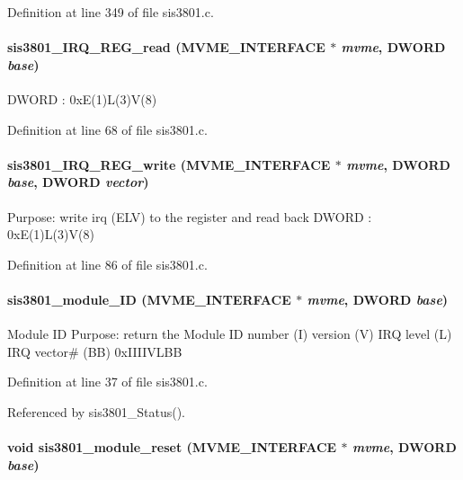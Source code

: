 Definition at line 349 of file sis3801.c.
\paragraph[{sis3801\_\-IRQ\_\-REG\_\-read}]{ sis3801\_\-IRQ\_\-REG\_\-read ({\bf MVME\_\-INTERFACE} $\ast$ {\em mvme}, \/  {\bf DWORD} {\em base})}\hfill\label{sis3801_8c_ab2680838fe73b65e48def0018ffbe04e}
DWORD : 0xE(1)L(3)V(8) 

Definition at line 68 of file sis3801.c.
\paragraph[{sis3801\_\-IRQ\_\-REG\_\-write}]{ sis3801\_\-IRQ\_\-REG\_\-write ({\bf MVME\_\-INTERFACE} $\ast$ {\em mvme}, \/  {\bf DWORD} {\em base}, \/  {\bf DWORD} {\em vector})}\hfill\label{sis3801_8c_a6d4c4e75a50958ca3bf22363f5f63617}
Purpose: write irq (ELV) to the register and read back DWORD : 0xE(1)L(3)V(8) 

Definition at line 86 of file sis3801.c.
\paragraph[{sis3801\_\-module\_\-ID}]{ sis3801\_\-module\_\-ID ({\bf MVME\_\-INTERFACE} $\ast$ {\em mvme}, \/  {\bf DWORD} {\em base})}\hfill\label{sis3801_8c_a751981870df7a28736f574b7679c5a7e}
Module ID Purpose: return the Module ID number (I) version (V) IRQ level (L) IRQ vector\# (BB) 0xIIIIVLBB 

Definition at line 37 of file sis3801.c.

Referenced by sis3801\_\-Status().
\paragraph[{sis3801\_\-module\_\-reset}]{\setlength{\rightskip}{0pt plus 5cm}void sis3801\_\-module\_\-reset ({\bf MVME\_\-INTERFACE} $\ast$ {\em mvme}, \/  {\bf DWORD} {\em base})}\hfill\label{sis3801_8c_a29883baa5a1d5399ba47bfffad05e03e}


